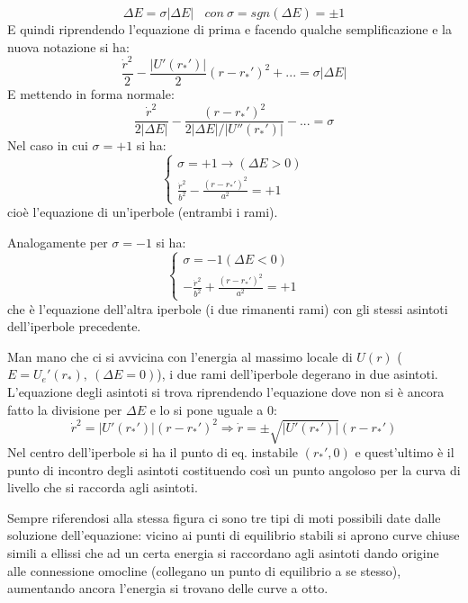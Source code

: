 \documentclass[Main.tex]{subfiles}
\begin{document}
\begin{equation}
  \Delta E = \sigma | \Delta E | \ \ \ \ con \ \sigma = sgn( \Delta E) = \pm 1
\end{equation}
E quindi riprendendo l'equazione di prima e facendo qualche semplificazione e la nuova notazione si ha:
\begin{equation}
  \frac{\dot r^2 }{2} - \frac{|U'(r_*')|}{2} (r-r_*')^2+... = \sigma |\Delta E|
\end{equation}
E mettendo in forma normale:
\begin{equation}
  \frac{\dot r^2}{2 |\Delta E|} - \frac{(r-r_*')^2}{2 | \Delta E| / |U''(r_*')|} - ... = \sigma
\end{equation}
Nel caso in cui $\sigma=+1$ si ha:
\begin{equation}
  \begin{cases}
	\sigma= + 1 \longrightarrow (\Delta E>0)\\
	\frac{\dot r^2}{b^2} - \frac{(r-r_*')^2}{a^2} = +1
\end{cases}
\end{equation}
cioè l'equazione di un'iperbole (entrambi i rami).

Analogamente per $\sigma = -1$ si ha:
\begin{equation}
  \begin{cases}
	\sigma= - 1 (\Delta E<0)\\
	-\frac{\dot r^2}{b^2} + \frac{(r-r_*')^2}{a^2} = +1
\end{cases}
\end{equation}
che è l'equazione dell'altra iperbole (i due rimanenti rami) con gli stessi asintoti dell'iperbole precedente.

Man mano che ci si avvicina con l'energia al massimo locale di $U(r)$ ($E= U_e'(r_*),\ (\Delta E =0)$), i due rami dell'iperbole degerano in due asintoti. L'equazione degli asintoti si trova riprendendo l'equazione dove non si è ancora fatto la divisione per $\Delta E$ e lo si pone uguale a 0:
\begin{equation}
  \dot r^2 = |U'(r_*')|(r-r_*')^2 \Longrightarrow
  \dot r= \pm \sqrt{|U'(r_*')|}(r-r_*')
\end{equation}
Nel centro dell'iperbole si ha il punto di eq. instabile $(r_*',0)$ e quest'ultimo è il punto di incontro degli asintoti costituendo così un punto angoloso per la curva di livello che si raccorda agli asintoti. 

Sempre riferendosi alla stessa figura ci sono tre tipi di moti possibili date dalle soluzione dell'equazione: vicino ai punti di equilibrio stabili si aprono curve chiuse simili a ellissi che ad un certa energia si raccordano agli asintoti dando origine alle connessione omocline (collegano un punto di equilibrio a se stesso), aumentando ancora l'energia si trovano delle curve a otto.
\end{document}
